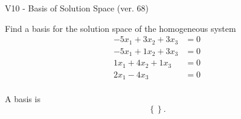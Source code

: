 \begin{exercise}
  \begin{exerciseTitle}V10 - Basis of Solution Space (ver. 68)\end{exerciseTitle}
  \begin{exerciseStatement}
    Find a basis for the solution space of the homogeneous system 
\begin{align*}
 -5 x_ 1 + 3 x_ 2 + 3 x_ 3 &= 0  \\ 
  -5 x_ 1 + 1 x_ 2 + 3 x_ 3 &= 0  \\ 
  1 x_ 1 + 4 x_ 2 + 1 x_ 3 &= 0  \\ 
  2 x_ 1 -4 x_ 3 &= 0  \\ 
 \end{align*}


 
  \end{exerciseStatement}

  \begin{exerciseAnswer}
   A basis is   
\[\left\{\right\}.\]

  


  \end{exerciseAnswer}
\end{exercise}